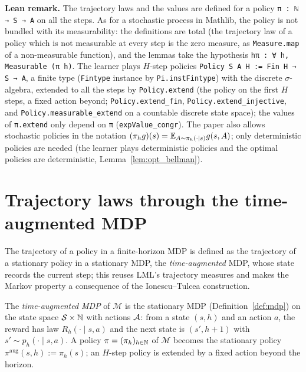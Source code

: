 \textbf{Lean remark.} The trajectory laws and the values are defined for a policy
\texttt{π : ℕ → S → A} on all the steps. As for a stochastic process in Mathlib, the policy is not
bundled with its measurability: the definitions are total (the trajectory law of a policy which
is not measurable at every step is the zero measure, as \texttt{Measure.map} of a non-measurable
function), and the lemmas take the hypothesis \texttt{hπ : ∀ h, Measurable (π h)}. The learner
plays $H$-step policies \texttt{Policy S A H := Fin H → S → A}, a finite type (\texttt{Fintype}
instance by \texttt{Pi.instFintype}) with the discrete $\sigma$-algebra, extended to all the steps
by \texttt{Policy.extend} (the policy on the first $H$ steps, a fixed action beyond;
\texttt{Policy.extend\_fin}, \texttt{Policy.extend\_injective}, and
\texttt{Policy.measurable\_extend} on a countable discrete state space); the values of
\texttt{π.extend} only depend on \texttt{π} (\texttt{expValue\_congr}). The paper also allows
stochastic policies in the notation $(\pi_h g)(s) = \mathbb{E}_{A \sim \pi_h(\cdot \mid s)} g(s, A)$;
only deterministic policies are needed (the learner plays deterministic policies and the
optimal policies are deterministic, Lemma~\ref{lem:opt_bellman}).

\section{Trajectory laws through the time-augmented MDP}
\label{sec:mdp_trajectories}

The trajectory of a policy in a finite-horizon MDP is defined as the trajectory of a
stationary policy in a stationary MDP, the \emph{time-augmented} MDP, whose state records the
current step; this reuses LML's trajectory measures and makes the Markov property a consequence
of the Ionescu--Tulcea construction.

\begin{definition}\label{def:layered_mdp}
\leanok
{}
The \emph{time-augmented MDP} of $\mathcal M$ is the stationary MDP (Definition~\ref{def:mdp})
on the state space $\mathcal{S} \times \mathbb{N}$ with actions $\mathcal{A}$: from a state $(s, h)$ and an action $a$,
the reward has law $R_h(\cdot \mid s, a)$ and the next state is $(s', h + 1)$ with
$s' \sim p_h(\cdot \mid s, a)$. A policy $\pi = (\pi_h)_{h \in \mathbb{N}}$ of $\mathcal M$ becomes the
stationary policy $\pi^{\mathrm{aug}}(s, h) := \pi_h(s)$; an $H$-step policy is extended by a
fixed action beyond the horizon.
\end{definition}

